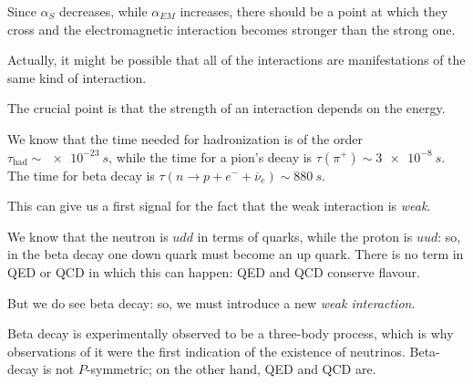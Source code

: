\documentclass[main.tex]{subfiles}
\begin{document}
Since \(\alpha_{S}\) decreases, while \(\alpha_{EM}\) increases, there should be a point at which they cross and the electromagnetic interaction becomes stronger than the strong one. 

Actually, it might be possible that all of the interactions are manifestations of the same kind of interaction. 

The crucial point is that the strength of an interaction depends on the energy. 

We know that the time needed for hadronization is of the order \(\tau _{\text{had}} \sim \SI{e-23}{s}\), while the time for a pion's decay is \(\tau (\pi^{+}) \sim \SI{3e-8}{s}\). 
The time for beta decay is \(\tau (n \to p + e^{-} + \overline{\nu}_{e}) \sim \SI{880}{s}\). 

This can give us a first signal for the fact that the weak interaction is \emph{weak}. 

We know that the neutron is \(u d d \) in terms of quarks, while the proton is \(u u d\): so, in the beta decay one down quark must become an up quark. 
There is no term in QED or QCD in which this can happen: QED and QCD conserve flavour.

But we do see beta decay: so, we must introduce a new \emph{weak interaction}.

Beta decay is experimentally observed to be a three-body process, which is why observations of it were the first indication of the existence of neutrinos. 
Beta-decay is not \(P\)-symmetric; on the other hand, QED and QCD are.
\end{document}
